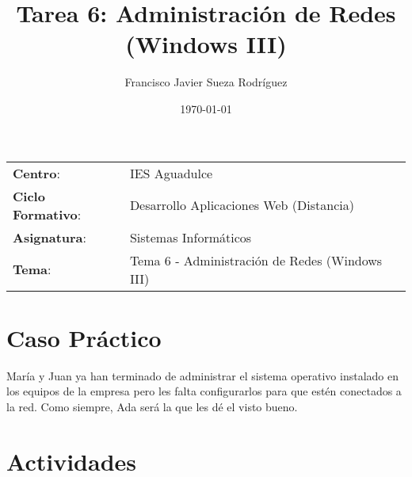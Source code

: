 


\title{
\vspace{10ex}
\normalfont \normalsize
\Huge \textbf{Tarea 6: Administración de Redes (Windows III)}
}
\author{Francisco Javier Sueza Rodríguez}
\date{\normalsize\today}



\maketitle

\thispagestyle{empty}

\vspace{68ex}

\begin{center}
    \begin{tabular}{l l}
        \textbf{Centro}: & IES Aguadulce \\
        \textbf{Ciclo Formativo}: & Desarrollo Aplicaciones Web (Distancia)\\
        \textbf{Asignatura}: & Sistemas Informáticos\\
        \textbf{Tema}: & Tema 6 -  Administración de Redes (Windows III)\\
    \end{tabular}
\end{center}

\newpage

\tableofcontents

\newpage

\listoffigures

\newpage

\section{Caso Práctico}
María y Juan ya han terminado de administrar el sistema operativo instalado en los equipos de la empresa pero les falta configurarlos para que estén conectados a la red. Como siempre, Ada será la que les dé el visto bueno.

\section{Actividades}

%
%


